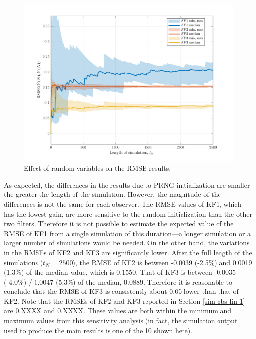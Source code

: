 \begin{figure}[htp]
	\centering
	\includegraphics[width=14cm]{images/rod_obs_sim1_3KF_seed_crmse_statsplot.pdf}
	\caption{Effect of random variables on the RMSE results.}
	\label{fig:rod-obs-sim-1-3KF-seed-crmse-statsplot}
\end{figure}

As expected, the differences in the results due to PRNG initialization are smaller the greater the length of the simulation. However, the magnitude of the differences is not the same for each observer. The RMSE values of KF1, which has the lowest gain, are more sensitive to the random initialization than the other two filters. Therefore it is not possible to estimate the expected value of the RMSE of KF1 from a single simulation of this duration---a longer simulation or a larger number of simulations would be needed. On the other hand, the variations in the RMSEs of KF2 and KF3 are significantly lower. After the full length of the simulations ($t_N=2500$), the RMSE of KF2 is between -0.0039 (-2.5\%) and 0.0019 (1.3\%) of the median value, which is $0.1550$.  That of KF3 is between -0.0035 (-4.0\%) / 0.0047 (5.3\%) of the median, 0.0889.  Therefore it is reasonable to conclude that the RMSE of KF3 is consistently about 0.05 lower than that of KF2. Note that the RMSEs of KF2 and KF3 reported in Section \ref{sim-obs-lin-1} are \alert{0.XXXX} and \alert{0.XXXX}. These values are both within the minimum and maximum values from this sensitivity analysis (in fact, the simulation output used to produce the main results is one of the 10 shown here).


